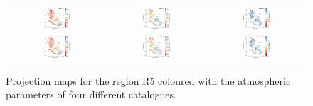 \documentclass{aa}
\begin{document}
\begin{appendix}
\begin{figure}[htbp]
\begin{tabular}{ccc}
        \includegraphics[width=0.3\textwidth]{Plots/tsne_params/tsne_R5_Teff_StarHorse2.pdf} &
        \includegraphics[width=0.3\textwidth]{Plots/tsne_params/tsne_R5_logg_StarHorse2.pdf} &
        \includegraphics[width=0.3\textwidth]{Plots/tsne_params/tsne_R5_FeH_StarHorse2.pdf} \\
        \includegraphics[width=0.3\textwidth]{Plots/tsne_params/tsne_R5_Teff_XP-LAMOST.pdf} &
        \includegraphics[width=0.3\textwidth]{Plots/tsne_params/tsne_R5_logg_XP-LAMOST.pdf} &
        \includegraphics[width=0.3\textwidth]{Plots/tsne_params/tsne_R5_FeH_XP-LAMOST.pdf} \\
    \end{tabular}
    \caption{Projection maps for the region R5 coloured with the atmospheric parameters of four different catalogues.}
\end{figure}


\end{appendix}
\end{document}
